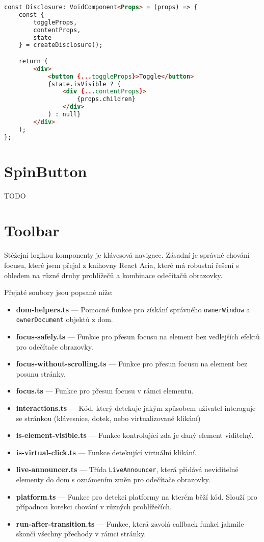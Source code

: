 \begin{lstlisting}[caption={Ukázka použití createDisclosure funkce}, label={disclosure-example}, language=html]
const Disclosure: VoidComponent<Props> = (props) => {
    const {
        toggleProps,
        contentProps,
        state
    } = createDisclosure();

    return (
        <div>
            <button {...toggleProps}>Toggle</button>
            {state.isVisible ? (
                <div {...contentProps}>
                    {props.children}
                </div>
            ) : null}
        </div>
    );
};
\end{lstlisting}

\section{SpinButton}

TODO

\clearpage

\section{Toolbar}

Stěžejní logikou komponenty  je klávesová navigace.
Zásadní je správné chování focusu, které jsem přejal z knihovny React Aria, které má robustní řešení s ohledem na různé druhy prohlížečů a kombinace odečítačů obrazovky.

Přejaté soubory jsou popsané níže:

\begin{itemize}
    \item \textbf{dom-helpers.ts} --- Pomocné funkce pro získání správného \texttt{ownerWindow} a \texttt{ownerDocument} objektů z \gls{dom}.
    \item \textbf{focus-safely.ts} --- Funkce pro přesun focusu na element bez vedlejších efektů pro odečítače obrazovky.
    \item \textbf{focus-without-scrolling.ts} --- Funkce pro přesun focusu na element bez posunu stránky.
    \item \textbf{focus.ts} --- Funkce pro přesun focusu v rámci elementu.
    \item \textbf{interactions.ts} --- Kód, který detekuje jakým způsobem uživatel interaguje se stránkou (klávesnice, dotek, nebo virtualizované klikání)
    \item \textbf{is-element-visible.ts} --- Funkce kontrolující zda je daný element viditelný.
    \item \textbf{is-virtual-click.ts} --- Funkce detekující virtuální klikání.
    \item \textbf{live-announcer.ts} --- Třída \texttt{LiveAnnouncer}, která přidává neviditelné elementy do \gls{dom} s oznámením změn pro odečítače obrazovky.
    \item \textbf{platform.ts} --- Funkce pro detekci platformy na kterém běží kód. Slouží pro případnou korekci chování v různých prohlížečích.
    \item \textbf{run-after-transition.ts} --- Funkce, která zavolá callback funkci jakmile skončí všechny přechody v rámci stránky.
\end{itemize}

